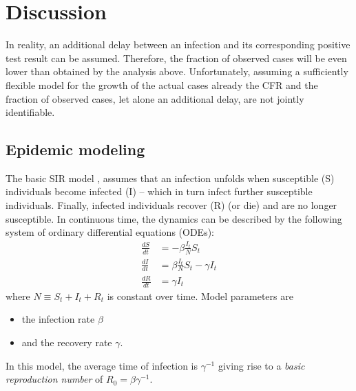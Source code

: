 \documentclass[fullpage,a4paper]{article}
\begin{document}
\section{Discussion}

In reality, an additional delay between an infection and its
corresponding positive test result can be assumed. Therefore, the
fraction of observed cases will be even lower than obtained by the
analysis above. Unfortunately, assuming a sufficiently flexible model
for the growth of the actual cases already the CFR and the fraction of
observed cases, let alone an additional delay, are not jointly
identifiable.

\subsection{Epidemic modeling}
The basic SIR model \cite{Newman}, assumes that an infection unfolds when
susceptible (S) individuals become infected (I) -- which in turn
infect further susceptible individuals. Finally, infected individuals
recover (R) (or die) and are no longer susceptible. In continuous
time, the dynamics can be described by the following system of
ordinary differential equations (ODEs):
\begin{align*}
  \frac{dS}{dt} &= - \beta \frac{I_t}{N} S_t \\
  \frac{dI}{dt} &= \beta \frac{I_t}{N} S_t - \gamma I_t \\
  \frac{dR}{dt} &= \gamma I_t
\end{align*}
where $N \equiv S_t + I_t + R_t$ is constant over time. Model
parameters are
\begin{itemize}
\item the infection rate $\beta$
\item and the recovery rate $\gamma$.
\end{itemize}
In this model, the average time of infection is $\gamma^{-1}$ giving
rise to a {\em basic reproduction number} of $R_0 = \beta
\gamma^{-1}$.
\end{document}
